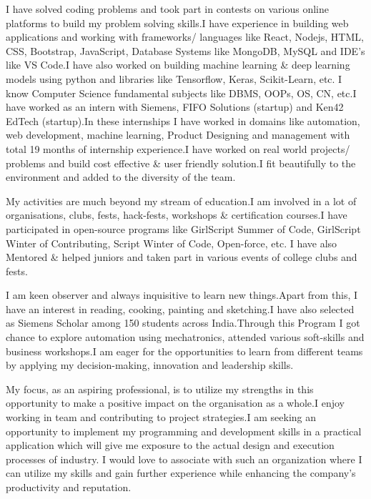 \documentclass[11pt,a4]{article}
\begin{document}
I have solved coding problems and took part in contests on various online platforms to build my problem solving skills.I have experience in building web applications and working with frameworks/ languages like React, Nodejs, HTML, CSS, Bootstrap, JavaScript, Database Systems like MongoDB, MySQL and IDE's like VS Code.I have also worked on building machine learning \& deep learning models using python and libraries like Tensorflow, Keras, Scikit-Learn, etc. I know Computer Science fundamental subjects like DBMS, OOPs, OS, CN, etc.I have worked as an intern with Siemens, FIFO Solutions (startup) and Ken42 EdTech (startup).In these internships I have worked in domains like automation, web development, machine learning, Product Designing and management with total 19 months of internship experience.I have worked on real world projects/ problems and build cost effective \& user friendly solution.I fit beautifully to the environment and added to the diversity of the team.\par

My activities are much beyond my stream of education.I am involved in a lot of organisations, clubs, fests, hack-fests, workshops \& certification courses.I have participated in open-source programs like GirlScript Summer of Code, GirlScript Winter of Contributing, Script Winter of Code, Open-force, etc. I have also Mentored \& helped juniors and taken part in various events of college clubs and fests.\par 

I am keen observer and always inquisitive to learn new things.Apart from this, I have an interest in reading, cooking, painting and sketching.I have also selected as Siemens Scholar among 150 students across India.Through this Program I got chance to explore automation using mechatronics, attended various soft-skills and business workshops.I am eager for the opportunities to learn from different teams by applying my decision-making, innovation and leadership skills.\par

My focus, as an aspiring professional, is to utilize my strengths in this opportunity to make a positive impact on the organisation as a whole.I enjoy working in team and contributing to project strategies.I am seeking an opportunity to implement my programming and development skills in a practical application which will give me exposure to the actual design and execution processes of industry. I would love to associate with such an organization where I can utilize my skills and gain further experience while enhancing the company’s productivity and reputation.\par
\end{document}

